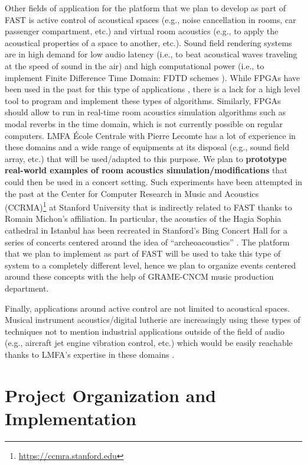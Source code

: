 \documentclass[a4paper,10pt]{article}
\newcommand{\PP}{FAST}
\begin{document}
Other fields of application for the platform that we plan to develop as part of \PP{} is active control of acoustical spaces (e.g., noise cancellation in rooms, car passenger compartment, etc.) and virtual room acoustics (e.g., to apply the acoustical properties of a space to another, etc.). Sound field rendering systems are in high demand for low audio latency (i.e., to beat acoustical waves traveling at the speed of sound in the air) and high computational power (i.e., to implement Finite Difference Time Domain: FDTD schemes \cite{Bilbao2009}). While FPGAs have been used in the past for this type of applications \cite{Tan2019}, there is a lack for a high level tool to program and implement these types of algorithms. Similarly, FPGAs should allow to run in real-time room acoustics simulation algorithms such as modal reverbs \cite{Abel2019} in the time domain, which is not currently possible on regular computers. LMFA École Centrale with Pierre Lecomte has a lot of experience in these domains and a wide range of equipments at its disposal (e.g., sound field array, etc.) that will be used/adapted to this purpose. We plan to \textbf{prototype real-world examples of room acoustics simulation/modifications} that could then be used in a concert setting. Such experiments have been attempted in the past at the Center for Computer Research in Music and Acoustics (CCRMA)\footnote{\url{https://ccmra.stanford.edu}} at Stanford University that is indirectly related to \PP{} thanks to Romain Michon's affiliation. In particular, the acoustics of the Hagia Sophia cathedral in Istanbul has been recreated in Stanford's Bing Concert Hall for a series of concerts centered around the idea of ``archeoacoustics'' \cite{Abel2009}. The platform that we plan to implement as part of \PP{} will be used to take this type of system to a completely different level, hence we plan to organize events centered around these concepts with the help of GRAME-CNCM music production department.

Finally, applications around active control are not limited to acoustical spaces. Musical instrument acoustics/digital lutherie are increasingly using these types of techniques \cite{Zhang2018} not to mention industrial applications outside of the field of audio (e.g., aircraft jet engine vibration control, etc.) which would be easily reachable thanks to LMFA's expertise in these domains \cite{salze2019new}.

\section*{Project Organization and Implementation}
\end{document}
